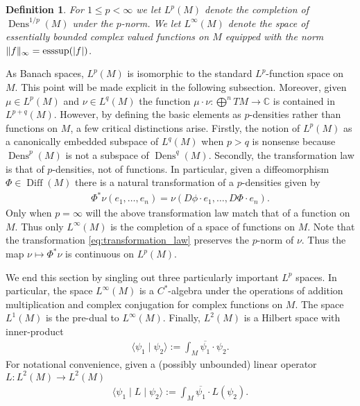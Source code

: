 \documentclass[12pt]{amsart}
\newtheorem{defn}[thm]{Definition}
\DeclareMathOperator{\Diff}{Diff}
\DeclareMathOperator{\Dens}{Dens}
\begin{document}
\begin{defn}
	For $1 \leq p < \infty$ we let $L^p(M)$ denote the completion of $\Dens^{1/p}(M)$ under the $p$-norm.
	We let $L^\infty(M)$ denote the space of essentially bounded complex valued functions on $M$
	equipped with the norm $\| f \|_\infty = {\rm esssup}(|f|)$.
\end{defn}

As Banach spaces, $L^p(M)$ is isomorphic to the standard $L^p$-function space on $M$.
This point will be made explicit in the following subsection.
Moreover, given $\mu \in L^p(M)$ and $\nu \in L^q(M)$ the function $\mu \cdot \nu : \bigoplus^n TM \to \mathbb{C}$ is
contained in $L^{p+q}(M)$.
However, by defining the basic elements as $p$-densities rather than functions on $M$, a few critical distinctions arise.
Firstly, the notion of $L^p(M)$ as a canonically embedded subspace of $L^q(M)$ when $p > q$ is nonsense because $\Dens^p(M)$ is not a subspace of $\Dens^q(M)$. 
Secondly, the transformation law is that of $p$-densities, not of functions.
In particular, given a diffeomorphism $\Phi \in \Diff(M)$
there is a natural transformation of a $p$-densities given by
\begin{align}
	\Phi^*\nu(e_1,\dots,e_n) = \nu( D\phi \cdot e_1 , \dots, D\Phi \cdot e_n). \label{eq:transformation_law}
\end{align}
Only when $p = \infty$ will the above transformation law match that of a function on $M$.
Thus only $L^\infty(M)$ is the completion of a space of functions on $M$.
Note that the transformation \eqref{eq:transformation_law} preserves the $p$-norm of $\nu$.
Thus the map $\nu \mapsto \Phi^* \nu$ is continuous on $L^p(M)$.

We end this section by singling out three particularly important $L^p$ spaces.
In particular, the space $L^\infty(M)$ is a $C^*$-algebra under the operations of addition multiplication and complex conjugation for complex functions on $M$.
	The space $L^1(M)$ is the pre-dual to $L^{\infty}(M)$.
	Finally, $L^2(M)$ is a Hilbert space with inner-product
	\begin{align*}
		\langle \psi_1 \mid \psi_2 \rangle := \int_M \overline{\psi_1} \cdot \psi_2.
	\end{align*}
	For notational convenience, given a (possibly unbounded) linear operator $L: L^2(M) \to L^2(M)$
	\begin{align*}
		\langle \psi_1 \mid L \mid \psi_2 \rangle := \int_M \overline{\psi_1} \cdot L(\psi_2).
	\end{align*}
\end{document}
